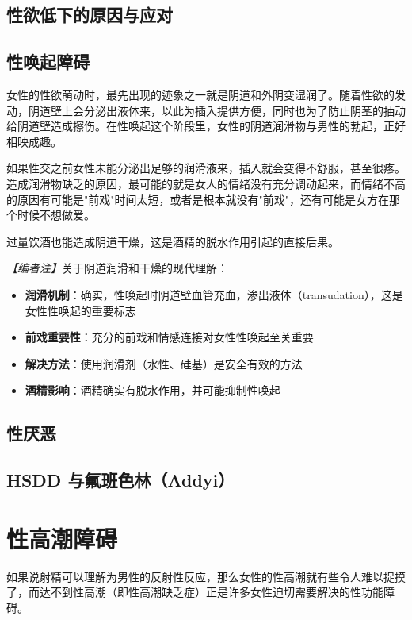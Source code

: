 \begin{enumerate}
\subsection{性欲低下的原因与应对}
\subsection{性唤起障碍}

女性的性欲萌动时，最先出现的迹象之一就是阴道和外阴变湿润了。随着性欲的发动，阴道壁上会分泌出液体来，以此为插入提供方便，同时也为了防止阴茎的抽动给阴道壁造成擦伤。在性唤起这个阶段里，女性的阴道润滑物与男性的勃起，正好相映成趣。

如果性交之前女性未能分泌出足够的润滑液来，插入就会变得不舒服，甚至很疼。造成润滑物缺乏的原因，最可能的就是女人的情绪没有充分调动起来，而情绪不高的原因有可能是"前戏"时间太短，或者是根本就没有"前戏"，还有可能是女方在那个时候不想做爱。

过量饮酒也能造成阴道干燥，这是酒精的脱水作用引起的直接后果。

\noindent\textit{【编者注】}关于阴道润滑和干燥的现代理解：
\begin{itemize}
	\item \textbf{润滑机制}：确实，性唤起时阴道壁血管充血，渗出液体（transudation），这是女性性唤起的重要标志
	\item \textbf{前戏重要性}：充分的前戏和情感连接对女性性唤起至关重要
	\item \textbf{解决方法}：使用润滑剂（水性、硅基）是安全有效的方法
	\item \textbf{酒精影响}：酒精确实有脱水作用，并可能抑制性唤起
\end{itemize}

\subsection{性厌恶}
\subsection{HSDD 与氟班色林（Addyi）}

\section{性高潮障碍}

如果说射精可以理解为男性的反射性反应，那么女性的性高潮就有些令人难以捉摸了，而达不到性高潮（即性高潮缺乏症）正是许多女性迫切需要解决的性功能障碍。


\end{enumerate}
